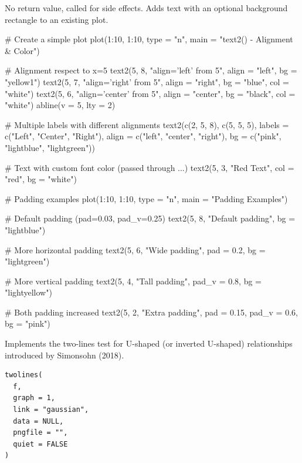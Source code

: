 \documentclass[a4paper]{book}
\begin{document}
%
\begin{Value}
No return value, called for side effects. Adds text with an optional 
background rectangle to an existing plot.
\end{Value}
%
\begin{Examples}
\begin{ExampleCode}
# Create a simple plot
plot(1:10, 1:10, type = "n", main = "text2() - Alignment & Color")

# Alignment respect to x=5
text2(5, 8, "align='left' from 5", align = "left", bg = "yellow1")
text2(5, 7, "align='right' from 5", align = "right", bg = "blue", col = "white")
text2(5, 6, "align='center' from 5", align = "center", bg = "black", col = "white")
abline(v = 5, lty = 2)

# Multiple labels with different alignments
text2(c(2, 5, 8), c(5, 5, 5), 
      labels = c("Left", "Center", "Right"),
      align = c("left", "center", "right"),
      bg = c("pink", "lightblue", "lightgreen"))

# Text with custom font color (passed through ...)
text2(5, 3, "Red Text", col = "red", bg = "white")

# Padding examples
plot(1:10, 1:10, type = "n", main = "Padding Examples")

# Default padding (pad=0.03, pad_v=0.25)
text2(5, 8, "Default padding", bg = "lightblue")

# More horizontal padding
text2(5, 6, "Wide padding", pad = 0.2, bg = "lightgreen")

# More vertical padding
text2(5, 4, "Tall padding", pad_v = 0.8, bg = "lightyellow")

# Both padding increased
text2(5, 2, "Extra padding", pad = 0.15, pad_v = 0.6, bg = "pink")
\end{ExampleCode}
\end{Examples}
%
\begin{Description}
Implements the two-lines test for U-shaped (or inverted U-shaped) relationships 
introduced by Simonsohn (2018).
\end{Description}
%
\begin{Usage}
\begin{verbatim}
twolines(
  f,
  graph = 1,
  link = "gaussian",
  data = NULL,
  pngfile = "",
  quiet = FALSE
)
\end{verbatim}
\end{Usage}
%
\end{document}
